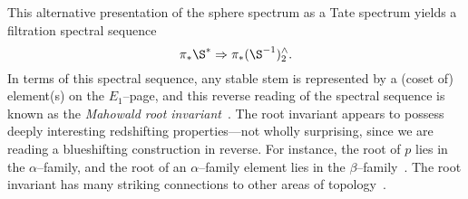This alternative presentation of the sphere spectrum as a Tate spectrum yields a filtration spectral sequence \[\pi_* \S^* \Rightarrow \pi_* (\S^{-1})^\wedge_2.\]  In terms of this spectral sequence, any stable stem is represented by a (coset of) element(s) on the \(E_1\)--page, and this reverse reading of the spectral sequence is known as the \textit{Mahowald root invariant}~\cite{MahowaldShick}.  The root invariant appears to possess deeply interesting redshifting properties---not wholly surprising, since we are reading a blueshifting construction in reverse.  For instance, the root of \(p\) lies in the \(\alpha\)--family, and the root of an \(\alpha\)--family element lies in the \(\beta\)--family~\cite{BehrensRootInv}.  The root invariant has many striking connections to other areas of topology~\cite{MahowaldRavenel}.

